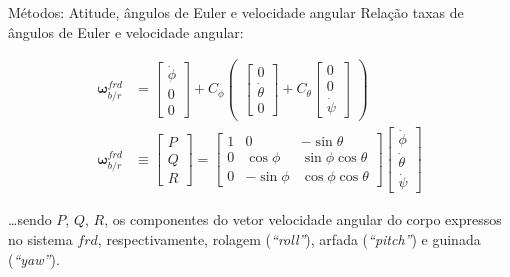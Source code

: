 \documentclass{beamer}
\begin{document}
\begin{frame}{Métodos: Atitude, ângulos de Euler e velocidade angular}
Relação taxas de ângulos de Euler e velocidade angular:

\begin{align*}
    \mathbf{\omega}^{frd}_{b/r} &= \begin{bmatrix} \dot\phi \\ 0 \\0 \end{bmatrix}
    + C_{\phi} \begin{pmatrix}
        \begin{bmatrix} 0 \\ \dot\theta \\ 0 \end{bmatrix}
        + C_{\theta}\begin{bmatrix} 0 \\ 0 \\ \dot\psi \end{bmatrix}
    \end{pmatrix} \\
    \mathbf{\omega}^{frd}_{b/r} 
    &\equiv \begin{bmatrix} P \\ Q \\ R \end{bmatrix}
    = \begin{bmatrix}
        1 & 0 & -\sin{\theta} \\
        0 & \cos{\phi} & \sin{\phi}\cos{\theta} \\
        0 & -\sin{\phi} & \cos{\phi}\cos{\theta}
    \end{bmatrix}
    \begin{bmatrix}
        \dot\phi \\
        \dot\theta \\
        \dot\psi
    \end{bmatrix}
\end{align*}

\ldots sendo \(P\), \(Q\), \(R\), os componentes do vetor velocidade angular do corpo expressos no sistema \(frd\), respectivamente, rolagem (\emph{``roll''}), arfada (\emph{``pitch''}) e guinada (\emph{``yaw''}).

\end{frame}
\end{document}
